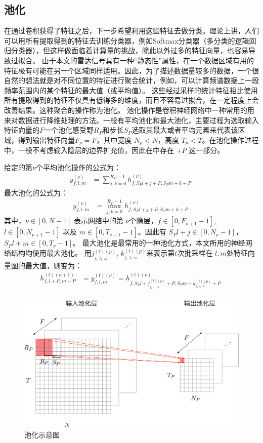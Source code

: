 \subsection{池化}
在通过卷积获得了特征之后，下一步希望利用这些特征去做分类。理论上讲，人们可以用所有提取得到的特征去训练分类器，例如Softmax分类器（多分类的逻辑回归分类器），但这样做面临着计算量的挑战，除此以外过多的特征向量，也容易导致过拟合。
由于本文的雷达信号具有一种“静态性”属性，在一个数据区域有用的特征极有可能在另一个区域同样适用。因此，为了描述数据量较多的数据，一个很自然的想法就是对不同位置的特征进行聚合统计，例如，可以计算频谱数据上一段频率范围内的某个特征的最大值（或平均值）。
这些经过采样的统计特征相比使用所有提取得到的特征不仅具有低得多的维度，而且不容易过拟合，在一定程度上会改善结果。这种聚合的操作称为池化。
池化操作是卷积神经网络中一种常用的用来对数据进行降维处理的方法。一般有平均池化和最大池化，主要过程为选取输入特征向量的$F$一个池化感受野$R_P$和步长$S_P$选取其最大或者平均元素来代表该区域，得到输出特征向量$F_p=F$，其中宽度 $N_p<N$，高度 $T_p<T$。在池化操作过程中，一般不考虑输入隐层的边界扩充值，因此在中存在 $+P$ 这一部分。

给定的第$\nu$个平均池化操作的公式为：
\begin{align}
  y_{f,l,m}^{(\nu)}&=\sum^{R_P-1}_{j,k=0} h_{f,S_Pl+j+P,S_Pm+k+P}^{(\nu)}\;
  \label{equ:pool}
\end{align}
最大池化的公式为：
\begin{align}
  y_{f,l,m}^{(\nu)}&=\max^{R_P-1}_{j,k=0} h_{f,S_Pl+j+P,S_Pm+k+P}^{(\nu)}\;
  \label{equ:maxpool}
\end{align}
其中，$\nu \in [0,N-1 ]$ 表示网络中的第 $\nu$个隐层，$f\in[0,F_{\nu+1}-1]$, $l\in[0,N_{\nu+1}-1 ]$ 以及 $m\in[0,T_{\nu+1}-1 ]$。因此有 $S_Pl+j\in[0,N_\nu-1 ]$， $S_Pl+m\in[0,T_\nu-1 ]$。
最大池化是最常用的一种池化方式，本文所用的神经网络结构均使用最大池化。
用$j^{(t)(p)}_{_{f，l，m}},\,k^{(t)(p)}_{_{f，l，m}}$来表示第$t$次批采样在 $l,m$处特征向量图的最大值，则变为：
\begin{align}
h_{f,l+P,m+P}^{(t)(\nu+1)}&=y_{f,l,m}^{(t)(\nu)}=
h^{(t)(\nu)}_{f,S_P l+j^{(t)(p)}_{_{f，l，m}}+P,S_Pm+k^{(t)(p)}_{_{f，l，m}}+P}\;
\end{align}

\begin{figure}[hbt]
	\centering
	\includegraphics[width=13.5cm]{figures/networks/pooling}
	\caption{池化示意图}
	\label{fig:pool}
\end{figure}

